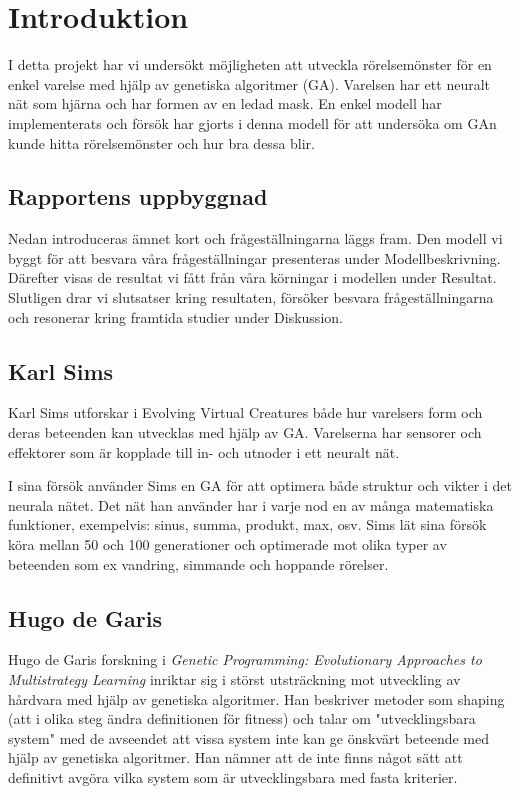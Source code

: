 \documentclass[titlepage, twocolumn, a4paper, 11pt, swedish]{article}
\begin{document}

\cleardoublepage
\newpage
\onecolumn
\tableofcontents
\cleardoublepage
\twocolumn
\cfoot{\thepage}


\section{Introduktion}

I detta projekt har vi undersökt möjligheten att utveckla rörelsemönster för en enkel varelse med hjälp av genetiska algoritmer (GA). Varelsen har ett neuralt nät som hjärna och har formen av en ledad mask. En enkel modell har implementerats och försök har gjorts i denna modell för att undersöka om GAn kunde hitta rörelsemönster och hur bra dessa blir. 

\subsection{Rapportens uppbyggnad}
Nedan introduceras ämnet kort och frågeställningarna läggs fram. Den modell vi byggt för att besvara våra frågeställningar presenteras under Modellbeskrivning. Därefter visas de resultat vi fått från våra körningar i modellen under Resultat. Slutligen drar vi slutsatser kring resultaten, försöker besvara frågeställningarna och resonerar kring framtida studier under Diskussion.

\subsection{Karl Sims}
Karl Sims utforskar i Evolving Virtual Creatures \cite{sims} både hur varelsers form och deras beteenden kan utvecklas med hjälp av GA. Varelserna har sensorer och effektorer som är kopplade till in- och utnoder i ett neuralt nät. 

I sina försök använder Sims en GA för att optimera både struktur och vikter i det neurala nätet. Det nät han använder har i varje nod en av många matematiska funktioner, exempelvis: sinus, summa, produkt, max, osv. Sims lät sina försök köra mellan 50 och 100 generationer och optimerade mot olika typer av beteenden som ex vandring, simmande och hoppande rörelser. 

\subsection{Hugo de Garis}
Hugo de Garis forskning i \textit{Genetic Programming: Evolutionary Approaches to Multistrategy Learning} \cite{garis} inriktar sig i störst utsträckning mot utveckling av hårdvara med hjälp av genetiska algoritmer. Han beskriver metoder som shaping (att i olika steg ändra definitionen för fitness) och talar om "utvecklingsbara system" med de avseendet att vissa system inte kan ge önskvärt beteende med hjälp av genetiska algoritmer. Han nämner att de inte finns något sätt att definitivt avgöra vilka system som är utvecklingsbara med fasta kriterier.
\end{document}
